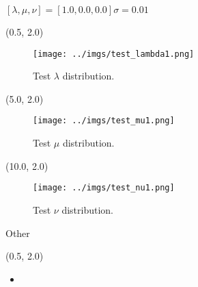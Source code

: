\documentclass[10pt, xcolor={dvipsnames}, aspectratio = 169, sans,mathserif]{beamer}
\begin{document}
\begin{frame}{$[\lambda, \mu, \nu] = [1.0, 0.0, 0.0] \sigma = 0.01$}

\begin{textblock}{5.0}(0.5, 2.0)
\begin{figure}
    \centering
    \texttt{[image: ../imgs/test\_lambda1.png]}
    \caption{Test $\lambda$ distribution.}
\end{figure}
\end{textblock}

\begin{textblock}{5.0}(5.0, 2.0)
\begin{figure}
    \centering
    \texttt{[image: ../imgs/test\_mu1.png]}
    \caption{Test $\mu$ distribution.}
\end{figure}
\end{textblock}

\begin{textblock}{5.0}(10.0, 2.0)
\begin{figure}
    \centering
    \texttt{[image: ../imgs/test\_nu1.png]}
    \caption{Test $\nu$ distribution.}
\end{figure}
\end{textblock}


\end{frame}

\begin{frame}{Other}

\begin{textblock}{15.0}(0.5, 2.0)

\begin{itemize}

    \item

\end{itemize}

\end{textblock}

\end{frame}
\end{document}
